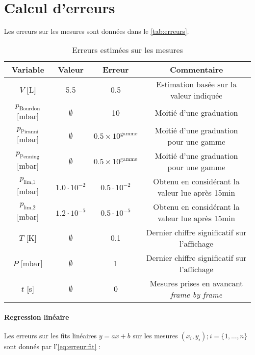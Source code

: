 \section{Calcul d'erreurs}

Les erreurs sur les mesures sont données dans le \autoref{tab:erreurs}.

\begin{table}[h]
    \centering
    \begin{tabulary}{\textwidth}{C C C C}
        \toprule
        Variable & Valeur & Erreur & Commentaire \\
        \midrule
        \(V\) [\si{\liter}] & 5.5 & 0.5 & Estimation basée sur la valeur indiquée \\
        \(p_\textrm{Bourdon}\) [\si{\milli\bar}] & \(\emptyset\) & 10 & Moitié d'une graduation \\
        \(p_\textrm{Piranni}\) [\si{\milli\bar}] & \(\emptyset\) & \(0.5 \times 10^\textrm{gamme}\) & Moitié d'une graduation pour une gamme \\
        \(p_\textrm{Penning}\) [\si{\milli\bar}] & \(\emptyset\) & \(0.5 \times 10^\textrm{gamme}\) & Moitié d'une graduation pour une gamme \\
        \(p_\textrm{lim,1}\) [\si{\milli\bar}] & \(1.0 \cdot 10^{-2}\) & \(0.5 \cdot 10^{-2}\) & Obtenu en considérant la valeur lue après 15min \\
        \(p_\textrm{lim,2}\) [\si{\milli\bar}] & \(1.2 \cdot 10^{-5}\) & \(0.5 \cdot 10^{-5}\) & Obtenu en considérant la valeur lue après 15min \\
        \midrule
        \(T\) [\si{\kelvin}] & \(\emptyset\) & 0.1 & Dernier chiffre significatif sur l'affichage \\
        \(P\) [\si{\milli\bar}] & \(\emptyset\) & 1 & Dernier chiffre significatif sur l'affichage \\
        \(t\) [\si{\second}] & \(\emptyset\) & 0 & Mesures prises en avancant \textit{frame by frame} \\
        \bottomrule
    \end{tabulary}
    \caption{Erreurs estimées sur les mesures}
    \label{tab:erreurs}
\end{table}

\paragraph*{Regression linéaire}
Les erreurs sur les fits linéaires \(y = ax + b\) sur les mesures \((x_i, y_i) ; i = \{1, \hdots, n\}\) sont donnés par l'\autoref{eq:erreur:fit} \cite{erreursmesure}:


